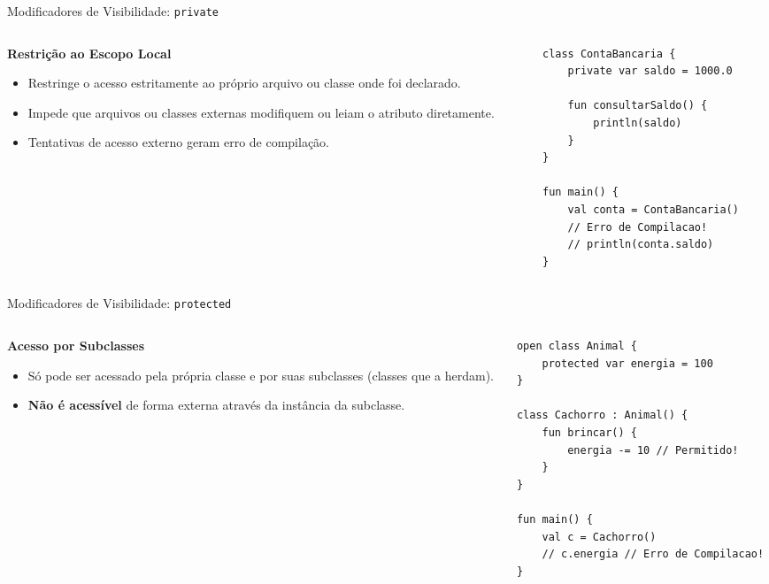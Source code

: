 \documentclass[aspectratio=169]{beamer}
\begin{document}
\begin{frame}[fragile]{Modificadores de Visibilidade: \texttt{private}}
  \begin{columns}[T]
    \begin{column}{0.46\textwidth}
      \textbf{Restrição ao Escopo Local}
      \vspace{0.3em}
      \begin{itemize}\small
        \item Restringe o acesso estritamente ao próprio arquivo ou classe onde foi declarado.
        \item Impede que arquivos ou classes externas modifiquem ou leiam o atributo diretamente.
        \item Tentativas de acesso externo geram erro de compilação.
      \end{itemize}
    \end{column}
    \begin{column}{0.51\textwidth}
\begin{lstlisting}[style=KotlinStyle]
class ContaBancaria {
    private var saldo = 1000.0

    fun consultarSaldo() {
        println(saldo)
    }
}

fun main() {
    val conta = ContaBancaria()
    // Erro de Compilacao!
    // println(conta.saldo)
}
\end{lstlisting}
    \end{column}
  \end{columns}
\end{frame}

\begin{frame}[fragile]{Modificadores de Visibilidade: \texttt{protected}}
  \begin{columns}[T]
    \begin{column}{0.46\textwidth}
      \textbf{Acesso por Subclasses}
      \vspace{0.3em}
      \begin{itemize}\small
        \item Só pode ser acessado pela própria classe e por suas subclasses (classes que a herdam).
        \item \textbf{Não é acessível} de forma externa através da instância da subclasse.
      \end{itemize}
    \end{column}
    \begin{column}{0.51\textwidth}
\begin{lstlisting}[style=KotlinStyle]
open class Animal {
    protected var energia = 100
}

class Cachorro : Animal() {
    fun brincar() {
        energia -= 10 // Permitido!
    }
}

fun main() {
    val c = Cachorro()
    // c.energia // Erro de Compilacao!
}
\end{lstlisting}
    \end{column}
  \end{columns}
\end{frame}
\end{document}
